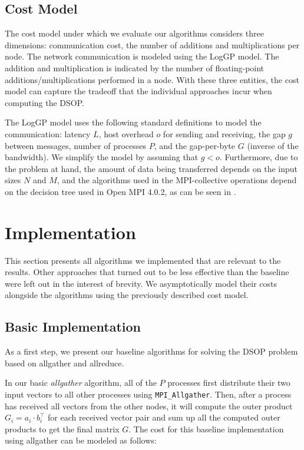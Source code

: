 \documentclass[letterpaper]{article}
\newcommand{\code}{\textit}
\begin{document}
\subsection{Cost Model}

The cost model under which we evaluate our algorithms considers three dimensions: communication cost, the number of additions and multiplications per node. The network communication is modeled using the LogGP model. The addition and multiplication is indicated by the number of floating-point additions/multiplications performed in a node.
With these three entities, the cost model can capture the tradeoff that the individual approaches incur when computing the DSOP.

The LogGP model uses the following standard definitions to model the communication: latency $L$, host overhead $o$ for sending and receiving, the gap $g$ between messages, number of processes $P$, and the gap-per-byte $G$ (inverse of the bandwidth). We simplify the model by assuming that $g < o$. Furthermore, due to the problem at hand, the amount of data being transferred depends on the input sizes $N$ and $M$, and the algorithms used in the MPI-collective operations depend on the decision tree used in Open MPI 4.0.2, as can be seen in \cite{openMPI_decision_tree_4_0_2}.


\section{Implementation}

This section presents all algorithms we implemented that are relevant to the results. Other approaches that turned out to be less effective than the baseline were left out in the interest of brevity. We asymptotically model their costs alongside the algorithms using the previously described cost model.\\[-23pt]

\subsection{Basic Implementation}\label{sec:baseline}
As a first step, we present our baseline algorithms for solving the DSOP problem based on allgather and allreduce. 

In our basic \code{allgather} algorithm, all of the $P$ processes first distribute their two input vectors to all other processes using \verb|MPI_Allgather|. Then, after a process has received all vectors from the other nodes, it will compute the outer product $G_i = a_i \cdot b_{i}^{\top}$ for each received vector pair and sum up all the computed outer products to get the final matrix $G$. The cost for this baseline implementation using allgather can be modeled as follows:
\end{document}
